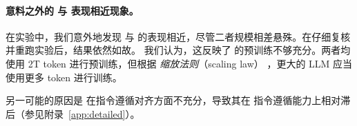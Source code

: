 \paragraph{意料之外的  与  表现相近现象。}
在实验中，我们意外地发现  与 
的表现相近，尽管二者规模相差悬殊。在仔细复核并重跑实验后，结果依然如故。
我们认为，这反映了  的预训练不够充分。两者均使用 2T
token 进行预训练，但根据 \emph{缩放法则}（scaling law）
\citep{hoffmann2022}，更大的 LLM 应当使用更多 token 进行训练。

另一可能的原因是  在指令遵循对齐方面不充分，导致其在
指令遵循能力上相对滞后（参见附录~\ref{app:detailed}）。
